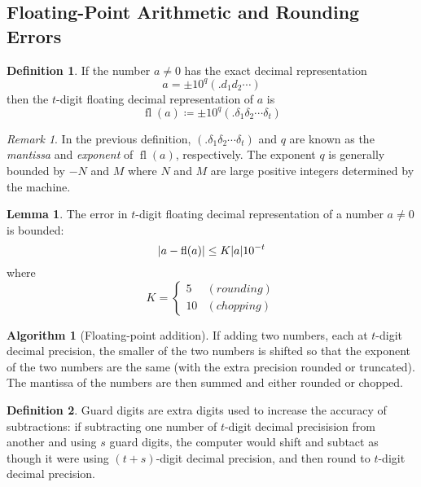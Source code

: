 \documentclass[11pt,letterpaper]{article}
\numberwithin{figure}{section} %
\newcommand{\keyword}[1]{\colorbox{cyan!20!}{#1}}
\DeclareMathOperator{\fl}{fl}
\theoremstyle{definition}
\theoremstyle{definition}
\newtheorem{lemma}{Lemma}[subsection]
\theoremstyle{definition}
\newtheorem{definition}{Definition}[subsection]
\theoremstyle{definition}
\theoremstyle{remark}
\newtheorem*{remark}{Remark}
\theoremstyle{remark}
\theoremstyle{definition}
\newtheorem*{algorithm}{Algorithm}
\theoremstyle{remark}
\theoremstyle{remark}
\begin{document}
\begin{multicols*}{3}
\subsection{Floating-Point Arithmetic and Rounding Errors}
\begin{definition}
	If the number $a \neq 0$ has the exact decimal representation
	\[
		a = \pm 10^q(.d_1 d_2 \cdots)
	\]
	then the \keyword{$t$-digit floating decimal representation} of $a$ is 
	\[
		\fl(a) \coloneqq \pm 10^q(.\delta_1 \delta_2 \cdots \delta_t)
	\]
\end{definition}
\begin{remark}
	In the previous definition, $(.\delta_1 \delta_2 \cdots \delta_t)$ and $q$
	are known as the \textit{mantissa} and \textit{exponent} of $\fl(a)$,
	respectively. The exponent $q$ is generally bounded by $-N$ and $M$ where
	$N$ and $M$ are large positive integers determined by the machine.
\end{remark}
\begin{lemma}
	The error in $t$-digit floating decimal representation of a number $a\neq 0$
	is bounded:
	\[
		\abs{a - \fl(a)} \leq K \abs{a} 10^{-t}
	\]
	where
	\[
		K = 
		\begin{cases*}
			5 & (rounding) \\
			10 & (chopping)
		\end{cases*}
	\]
\end{lemma}
\begin{algorithm}[Floating-point addition]
	If adding two numbers, each at $t$-digit decimal precision, the smaller of
	the two numbers is shifted so that the exponent of the two numbers are the
	same (with the extra precision rounded or truncated). The
	mantissa of the numbers are then summed and either rounded or chopped.
\end{algorithm}
\begin{definition}
	\keyword{Guard digits} are extra digits used to increase the accuracy of
	subtractions: if subtracting one number of $t$-digit decimal precisision from
	another and using $s$ guard digits, the computer would shift and subtact as
	though it were using $(t+s)$-digit decimal precision, and then round to
	$t$-digit decimal precision.
\end{definition}

\end{multicols*}
\end{document}
